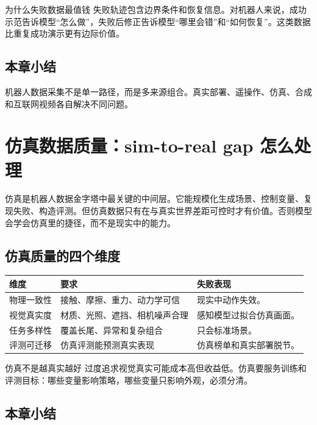 \documentclass[a4paper]{article}
\begin{document}
\begin{knowledgebox}{为什么失败数据最值钱}
失败轨迹包含边界条件和恢复信息。对机器人来说，成功示范告诉模型“怎么做”，失败后修正告诉模型“哪里会错”和“如何恢复”。这类数据比重复成功演示更有边际价值。
\end{knowledgebox}

\subsection{本章小结}

机器人数据采集不是单一路径，而是多来源组合。真实部署、遥操作、仿真、合成和互联网视频各自解决不同问题。

\section{仿真数据质量：sim-to-real gap 怎么处理}

仿真是机器人数据金字塔中最关键的中间层。它能规模化生成场景、控制变量、复现失败、构造评测。但仿真数据只有在与真实世界差距可控时才有价值。否则模型会学会仿真里的捷径，而不是现实中的能力。

\subsection{仿真质量的四个维度}

\noindent\begin{tabularx}{\textwidth}{p{}p{}X}
\toprule
维度 & 要求 & 失败表现 \\
\midrule
物理一致性 & 接触、摩擦、重力、动力学可信 & 现实中动作失效。 \\
视觉真实度 & 材质、光照、遮挡、相机噪声合理 & 感知模型过拟合仿真画面。 \\
任务多样性 & 覆盖长尾、异常和复杂组合 & 只会标准场景。 \\
评测可迁移 & 仿真评测能预测真实表现 & 仿真榜单和真实部署脱节。 \\
\bottomrule
\end{tabularx}

\begin{warningbox}{仿真不是越真实越好}
过度追求视觉真实可能成本高但收益低。仿真要服务训练和评测目标：哪些变量影响策略，哪些变量只影响外观，必须分清。
\end{warningbox}

\subsection{本章小结}
\end{document}
